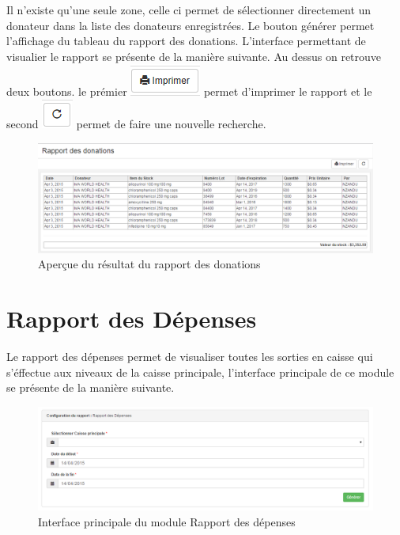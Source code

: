 \documentclass[12pt,a4paper]{report}
\begin{document}
Il n'existe qu'une seule zone, celle ci permet de sélectionner directement un donateur dans la liste des donateurs enregistrées. Le bouton générer permet l'affichage du tableau du rapport des donations. L'interface permettant de visualier le rapport se présente de la manière suivante. Au dessus on retrouve deux boutons. le prémier 
\includegraphics[scale=0.7]{pic/Print.png} permet d'imprimer le rapport et le second \includegraphics[scale=0.7]{pic/refresh.png} permet de faire une nouvelle recherche.


\begin{figure}[h]
\begin{center}
\includegraphics[width=14cm]{pic/DonationsRapport.png}
\end{center}
\caption{Aperçue du résultat du rapport des donations}
\label{Aperçue du résultat du rapport des donations}
\end{figure}


\newpage
\section{Rapport des Dépenses}
Le rapport des dépenses permet de visualiser toutes les sorties en caisse qui s'éffectue aux niveaux de la caisse principale, l'interface principale de ce module se présente de la manière suivante.

\begin{figure}[h]
\begin{center}
\includegraphics[width=14cm]{pic/RapDepensesInterface.png}
\end{center}
\caption{Interface principale du module Rapport des dépenses}
\label{Interface principale du module Rapport des dépenses}
\end{figure}
\end{document}
